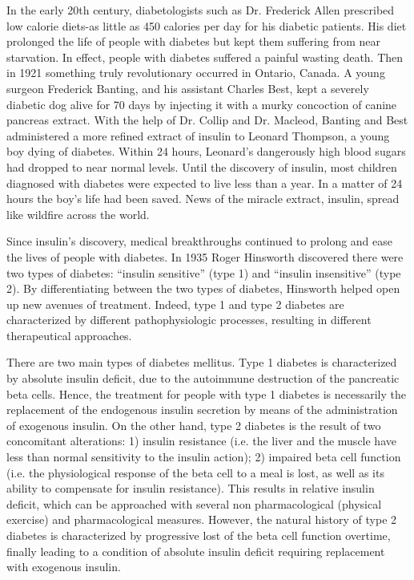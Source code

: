 In the early 20th century, diabetologists such as Dr. Frederick Allen prescribed low calorie diets-as little as 450 calories per day for his diabetic patients. His diet prolonged the life of people with diabetes but kept them suffering from near starvation. In effect, people with diabetes suffered a painful wasting death. Then in 1921 something truly revolutionary occurred in Ontario, Canada. A young surgeon Frederick Banting, and his assistant Charles Best, kept a severely diabetic dog alive for 70 days by injecting it with a murky concoction of canine pancreas extract. With the help of Dr. Collip and Dr. Macleod, Banting and Best administered a more refined extract of insulin to Leonard Thompson, a young boy dying of diabetes. Within 24 hours, Leonard's dangerously high blood sugars had dropped to near normal levels. Until the discovery of insulin, most children diagnosed with diabetes were expected to live less than a year. In a matter of 24 hours the boy's life had been saved. News of the miracle extract, insulin, spread like wildfire across the world.

Since insulin's discovery, medical breakthroughs continued to prolong and ease the lives of people with diabetes. In 1935 Roger Hinsworth discovered there were two types of diabetes: ``insulin sensitive'' (type 1) and ``insulin insensitive'' (type 2). By differentiating between the two types of diabetes, Hinsworth helped open up new avenues of treatment. Indeed, type 1 and type 2 diabetes are characterized by different pathophysiologic processes, resulting in different therapeutical approaches. 


There are two main types of diabetes mellitus. Type 1 diabetes is characterized by absolute insulin deficit, due to the autoimmune destruction of the pancreatic beta cells. Hence, the treatment for people with type 1 diabetes is necessarily the replacement of the endogenous insulin secretion by means of the administration of exogenous insulin. On the other hand, type 2 diabetes is the result of two concomitant alterations: 1) insulin resistance (i.e. the liver and the muscle have less than normal sensitivity to the insulin action); 2) impaired beta cell function (i.e. the physiological response of the beta cell to a meal is lost, as well as its ability to compensate for insulin resistance). This results in relative insulin deficit, which can be approached with several non pharmacological (physical exercise) and pharmacological measures. However, the natural history of type 2 diabetes is characterized by progressive lost of the beta cell function overtime, finally leading to a condition of absolute insulin deficit requiring replacement with exogenous insulin.

